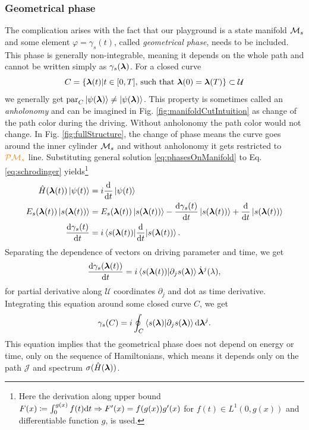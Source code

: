 \subsubsection{Geometrical phase}
The complication arises with the fact that our playground is a state manifold $\mathcal{M}_s$ and some element $\varphi=\gamma_s(t)$, called \emph{geometrical phase}, needs to be included. This phase is generally non-integrable, meaning it depends on the whole path and cannot be written simply as $\gamma_s({\bm\lambda})$. For a closed curve
\begin{equation}
    C=\{{\bm\lambda}(t)|t\in[0,T] \text{, such that }{\bm\lambda}(0)={\bm\lambda}(T)\}\subset \mathcal U
\end{equation} 
we generally get $\textrm{par}_C \ket{\psi({\bm\lambda})}\neq \ket{\psi({\bm\lambda})}$. This property is sometimes called an \emph{anholonomy} and can be imagined in Fig. \ref{fig:manifoldCutIntuition} as change of the path color during the driving. Without anholonomy the path color would not change. In Fig. \ref{fig:fullStructure}, the change of phase means the curve goes around the inner cylinder $\mathcal{M}_s$ and without anholonomy it gets restricted to $\textcolor{orange}{\mathcal{P}\mathcal{M}_s}$ line. Substituting general solution \ref{eq:phasesOnManifold} to Eq. \ref{eq:schrodinger} yields\footnote{Here the derivation along upper bound $F(x)\coloneqq\int_0^{g(x)}f(t)\mathrm{d} t \Rightarrow F'(x)=f(g(x))g'(x)$ for $f(t)\in L^1(0,g(x))$ and differentiable function $g$, is used.} 
\begin{align}
    \hat{H}({\bm\lambda}(t))\ket{\psi(t)} &= i\frac{\mathrm{d} }{\mathrm{d} t}\ket{\psi(t)}\\
    E_s({\bm\lambda}(t)) \ket{s({\bm\lambda}(t))} &= E_s({\bm\lambda}(t))\ket{s({\bm\lambda}(t))} -\frac{\mathrm{d} \gamma_s(t)}{\mathrm{d} t}\ket{s({\bm\lambda}(t))}+ \frac{\mathrm{d} }{\mathrm{d} t}\ket{s({\bm\lambda}(t))}\\
    \frac{\mathrm{d} \gamma_s(t)}{\mathrm{d} t}&=i\braket{s({\bm\lambda}(t))|
    \frac{\mathrm{d} }{\mathrm{d} t}|s({\bm\lambda}(t))}.
\end{align}
 Separating the dependence of vectors on driving parameter and time, we get
\begin{equation}
    \frac{\mathrm{d} \gamma_s({\bm\lambda}(t))}{\mathrm{d} t} =i\braket{s({\bm\lambda}(t))|\partial_j s({\bm\lambda})} \dot{{\bm\lambda}}^j(\lambda),
\end{equation}
for partial derivative along $\mathcal U$ coordinates $\partial_j$ and dot as time derivative. Integrating this equation around some closed curve $C$, we get
\begin{equation}
    \gamma_s(C)=i\oint_C\braket{s({\bm\lambda})|\partial_j s({\bm\lambda})}\mathrm{d} {\bm\lambda}^j.
    \label{eq:gammaCoint}
\end{equation}
This equation implies that the geometrical phase does not depend on energy or time, only on the sequence of Hamiltonians, which means it depends only on the path $\mathcal J$ and spectrum $\sigma(\hat{H}({\bm\lambda}))$.



